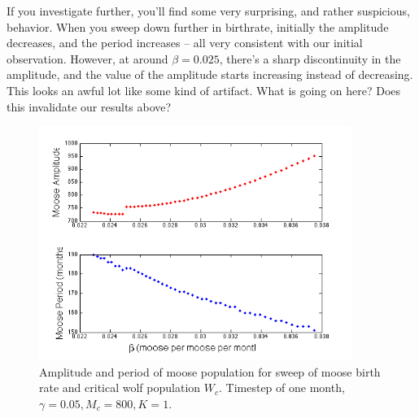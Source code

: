 \begin{del}

If you investigate further, you'll find some very surprising, and rather suspicious, behavior.  When you sweep down further in birthrate, initially the amplitude decreases, and the period increases -- all very consistent with our initial observation.  However, at around $\beta = 0.025$, there's a sharp discontinuity in the amplitude, and the value of the amplitude starts increasing instead of  decreasing.   This looks an awful lot like some kind of artifact.  What is going on here?  Does this invalidate our results above?

\begin{figure}[h!]
\includegraphics[width=4in]{figs/MooseBCSweep}
\caption{Amplitude and period of moose population for sweep of moose birth rate and critical wolf population $W_c$.  Timestep of one month,  $\gamma = 0.05, M_c = 800, K=1$.}
\end{figure}

\end{del}
